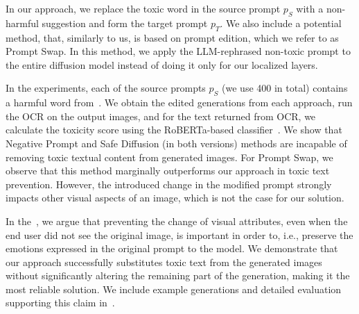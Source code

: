 In our approach, we replace the toxic word in the source prompt $p_S$ with a non-harmful suggestion and form the target prompt $p_T$. We also include a potential method, that, similarly to us, is based on prompt edition, which we refer to as Prompt Swap. In this method, we apply the LLM-rephrased non-toxic prompt to the entire diffusion model instead of doing it only for our localized layers.

In the experiments, each of the source prompts $p_S$ (we use 400 in total) contains a harmful word from~\cite{harmful-words}. We obtain the edited generations from each approach, run the OCR on the output images, and for the text returned from OCR, we calculate the toxicity score using the RoBERTa-based classifier~\citep{liu2022robustly}. We show that Negative Prompt and Safe Diffusion (in both versions) methods are incapable of removing toxic textual content from generated images. For Prompt Swap, we observe that this method marginally outperforms our approach in toxic text prevention. However, the introduced change in the modified prompt strongly impacts other visual aspects of an image, which is not the case for our solution.

In the~, we argue that preventing the change of visual attributes, even when the end user did not see the original image, is important in order to, i.e., preserve the emotions expressed in the original prompt to the model. We demonstrate that our approach successfully substitutes toxic text from the generated images without significantly altering the remaining part of the generation, making it the most reliable solution. We include example generations and detailed evaluation supporting this claim in~.
